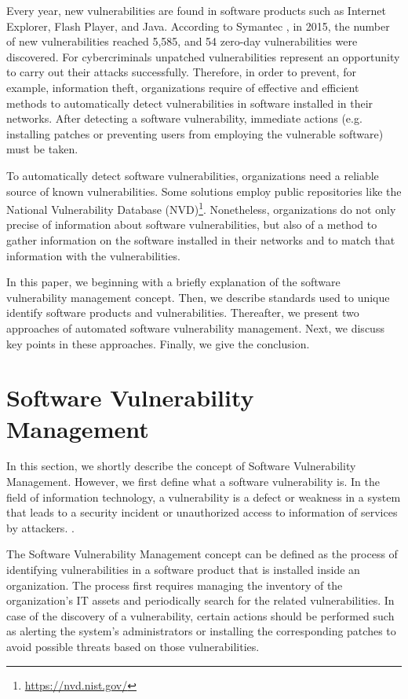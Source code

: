 \documentclass{llncs}
\begin{document}
\par Every year, new vulnerabilities are found in software products such as Internet Explorer, Flash 
 Player, and Java. According to Symantec \cite{symantec}, in 2015, the number of new vulnerabilities 
 reached 5,585, and 54 zero-day vulnerabilities were discovered. For cybercriminals 
 unpatched vulnerabilities represent an opportunity to carry out their attacks successfully. 
 Therefore, in order to prevent, for example, information theft, organizations require of 
 effective and efficient methods to automatically detect vulnerabilities in software installed in 
 their networks. After detecting a software vulnerability, immediate actions (e.g. installing 
 patches or preventing users from employing the vulnerable software) must be taken. 
 \par To automatically detect software vulnerabilities, organizations need a reliable source of 
 known vulnerabilities. Some solutions employ public repositories like the National 
 Vulnerability Database (NVD)\footnote{\url{https://nvd.nist.gov/}}. Nonetheless, organizations do not only precise of information 
 about software vulnerabilities, but also of a method to gather information on the software 
 installed in their networks and to match that information with the vulnerabilities. 
 \par In this paper, we beginning with a briefly explanation of the software vulnerability 
 management concept. Then, we describe standards used to unique identify software products 
 and vulnerabilities. Thereafter, we present two approaches of automated software vulnerability management. Next, we discuss key points in these approaches. Finally, we give the conclusion.
       
\section{Software Vulnerability Management}

In this section, we shortly describe the concept of Software Vulnerability Management. However, we first define what a software vulnerability is. In the field of information technology, a vulnerability is a defect or weakness in a system that leads to a security incident or unauthorized access to information of services by attackers. \cite{vuln}.  

\par The Software Vulnerability Management concept can be defined as the process of identifying vulnerabilities in a software product that is installed inside an organization. The process first requires managing the inventory of the organization's IT assets and  periodically search for the related vulnerabilities. In case of the discovery of a vulnerability, certain actions should be performed such as alerting the system's administrators or installing the corresponding patches to avoid possible threats based on those vulnerabilities. 
\end{document}
